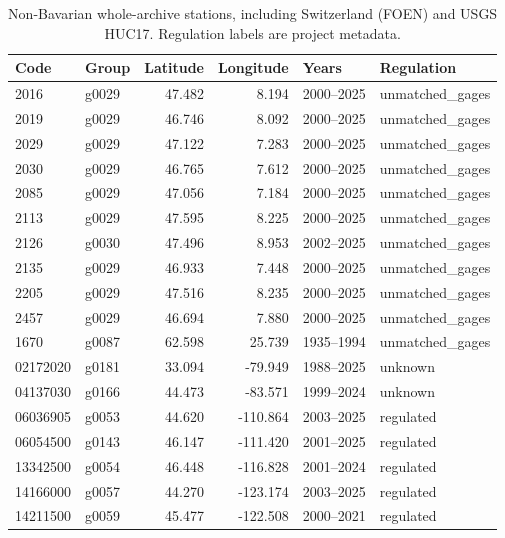 \begin{table}[p]\centering\footnotesize
\setlength{\tabcolsep}{3pt}
\caption{Non-Bavarian whole-archive stations, including Switzerland (FOEN) and USGS HUC17. Regulation labels are project metadata.}
\label{tab:station-roster-other}
\begin{tabular}{llrrll}
\toprule
Code & Group & Latitude & Longitude & Years & Regulation \\
\midrule
2016 & g0029 & 47.482 & 8.194 & 2000--2025 & unmatched\_gages \\
2019 & g0029 & 46.746 & 8.092 & 2000--2025 & unmatched\_gages \\
2029 & g0029 & 47.122 & 7.283 & 2000--2025 & unmatched\_gages \\
2030 & g0029 & 46.765 & 7.612 & 2000--2025 & unmatched\_gages \\
2085 & g0029 & 47.056 & 7.184 & 2000--2025 & unmatched\_gages \\
2113 & g0029 & 47.595 & 8.225 & 2000--2025 & unmatched\_gages \\
2126 & g0030 & 47.496 & 8.953 & 2002--2025 & unmatched\_gages \\
2135 & g0029 & 46.933 & 7.448 & 2000--2025 & unmatched\_gages \\
2205 & g0029 & 47.516 & 8.235 & 2000--2025 & unmatched\_gages \\
2457 & g0029 & 46.694 & 7.880 & 2000--2025 & unmatched\_gages \\
1670 & g0087 & 62.598 & 25.739 & 1935--1994 & unmatched\_gages \\
02172020 & g0181 & 33.094 & -79.949 & 1988--2025 & unknown \\
04137030 & g0166 & 44.473 & -83.571 & 1999--2024 & unknown \\
06036905 & g0053 & 44.620 & -110.864 & 2003--2025 & regulated \\
06054500 & g0143 & 46.147 & -111.420 & 2001--2025 & regulated \\
13342500 & g0054 & 46.448 & -116.828 & 2001--2024 & regulated \\
14166000 & g0057 & 44.270 & -123.174 & 2003--2025 & regulated \\
14211500 & g0059 & 45.477 & -122.508 & 2000--2021 & regulated \\
\bottomrule\end{tabular}
\end{table}

